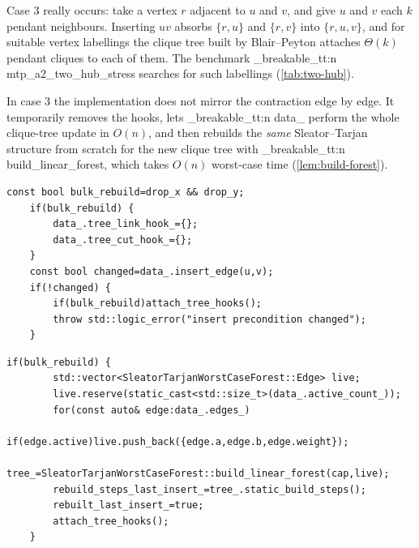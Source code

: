\documentclass[11pt,a4paper,oneside]{report}
\theoremstyle{plain}
\theoremstyle{definition}
\theoremstyle{remark}
\DeclareRobustCommand{\code}[1]{\mtp_breakable_tt:n {#1}}
\DeclareRobustCommand{\file}[1]{\mtp_breakable_tt:n {#1}}
\begin{document}
Case 3 really occurs: take a vertex \(r\) adjacent to \(u\) and \(v\), and give \(u\) and \(v\)
each \(k\) pendant neighbours. Inserting \(uv\) absorbs \(\{r,u\}\) and \(\{r,v\}\) into
\(\{r,u,v\}\), and for suitable vertex labellings the clique tree built by Blair--Peyton attaches
\(\Theta(k)\) pendant cliques to each of them. The benchmark \code{mtp_a2_two_hub_stress}
searches for such labellings (\cref{tab:two-hub}).

\begin{keyidea}
In case 3 the implementation does not mirror the contraction edge by edge. It temporarily
removes the hooks, lets \code{data_} perform the whole clique-tree update in \(O(n)\), and then
rebuilds the \emph{same} Sleator--Tarjan structure from scratch for the new clique tree with
\code{build_linear_forest}, which takes \(O(n)\) worst-case time (\cref{lem:build-forest}).
\end{keyidea}

\begin{lstlisting}[style=cpp,firstnumber=253,caption={\file{src/dynamic_ibarra_a2.cpp}, lines 253--262: case 3: detach the hooks before the clique-tree update \ldots},label={lst:a2-bulk1}]
    const bool bulk_rebuild=drop_x && drop_y;
    if(bulk_rebuild) {
        data_.tree_link_hook_={};
        data_.tree_cut_hook_={};
    }
    const bool changed=data_.insert_edge(u,v);
    if(!changed) {
        if(bulk_rebuild)attach_tree_hooks();
        throw std::logic_error("insert precondition changed");
    }
\end{lstlisting}

\begin{lstlisting}[style=cpp,firstnumber=281,caption={\file{src/dynamic_ibarra_a2.cpp}, lines 281--290: \ldots{} and rebuild the Sleator--Tarjan forest in linear time.},label={lst:a2-bulk2}]
    if(bulk_rebuild) {
        std::vector<SleatorTarjanWorstCaseForest::Edge> live;
        live.reserve(static_cast<std::size_t>(data_.active_count_));
        for(const auto& edge:data_.edges_)
            if(edge.active)live.push_back({edge.a,edge.b,edge.weight});
        tree_=SleatorTarjanWorstCaseForest::build_linear_forest(cap,live);
        rebuild_steps_last_insert_=tree_.static_build_steps();
        rebuilt_last_insert_=true;
        attach_tree_hooks();
    }
\end{lstlisting}
\end{document}
